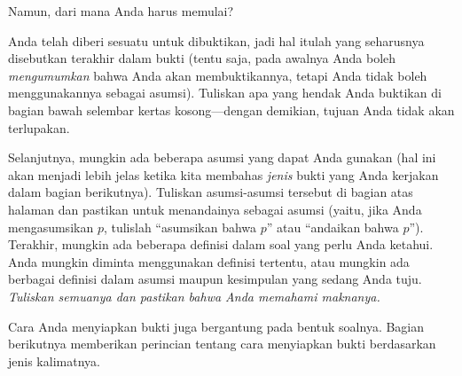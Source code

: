\documentclass[../../../include/open-logic-section]{subfiles}
\begin{document}


Namun, dari mana Anda harus memulai?

Anda telah diberi sesuatu untuk dibuktikan, jadi hal itulah yang
seharusnya disebutkan terakhir dalam bukti (tentu saja, pada awalnya
Anda boleh \emph{mengumumkan} bahwa Anda akan membuktikannya, tetapi
Anda tidak boleh menggunakannya sebagai asumsi). Tuliskan apa yang
hendak Anda buktikan di bagian bawah selembar kertas kosong---dengan
demikian, tujuan Anda tidak akan terlupakan.

Selanjutnya, mungkin ada beberapa asumsi yang dapat Anda gunakan (hal
ini akan menjadi lebih jelas ketika kita membahas \emph{jenis} bukti
yang Anda kerjakan dalam bagian berikutnya). Tuliskan asumsi-asumsi
tersebut di bagian atas halaman dan pastikan untuk menandainya sebagai
asumsi (yaitu, jika Anda mengasumsikan $p$, tulislah ``asumsikan bahwa
$p$'' atau ``andaikan bahwa $p$''). Terakhir, mungkin ada beberapa
definisi dalam soal yang perlu Anda ketahui. Anda mungkin diminta
menggunakan definisi tertentu, atau mungkin ada berbagai definisi
dalam asumsi maupun kesimpulan yang sedang Anda tuju. \emph{Tuliskan
semuanya dan pastikan bahwa Anda memahami maknanya.}

Cara Anda menyiapkan bukti juga bergantung pada bentuk soalnya.
Bagian berikutnya memberikan perincian tentang cara menyiapkan bukti
berdasarkan jenis kalimatnya.
\end{document}
